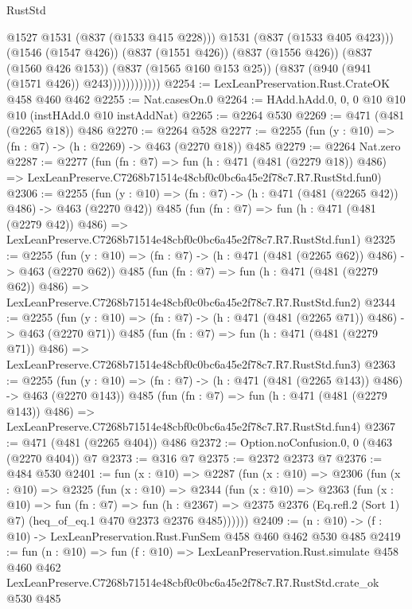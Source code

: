 \begin{lexlean}{RustStd}
\begin{coremodule}
                            @1527
                            @1531
                            (@837 (@1533 @415 @228)))
                          @1531
                          (@837 (@1533 @405 @423)))
                        (@1546 (@1547 @426))
                        (@837 (@1551 @426))
                        (@837 (@1556 @426))
                        (@837 (@1560 @426 @153))
                        (@837 (@1565 @160 @153 @25))
                        (@837 (@940 (@941 (@1571 @426)) @243))))))))))))
@2254 := LexLeanPreservation.Rust.CrateOK @458 @460 @462
@2255 := Nat.casesOn.{0}
@2264 := HAdd.hAdd.{0, 0, 0} @10 @10 @10 (instHAdd.{0} @10 instAddNat)
@2265 := @2264 @530
@2269 := @471 (@481 (@2265 @18)) @486
@2270 := @2264 @528
@2277 := @2255 (fun (y : @10) => (fn : @7) -> (h : @2269) -> @463 (@2270 @18)) @485
@2279 := @2264 Nat.zero
@2287 := @2277
    (fun (fn : @7) =>
    fun (h : @471 (@481 (@2279 @18)) @486) =>
    LexLeanPreserve.C7268b71514e48cbf0c0bc6a45e2f78c7.R7.RustStd.fun0)
@2306 := @2255
    (fun (y : @10) => (fn : @7) -> (h : @471 (@481 (@2265 @42)) @486) -> @463 (@2270 @42))
    @485
    (fun (fn : @7) =>
    fun (h : @471 (@481 (@2279 @42)) @486) =>
    LexLeanPreserve.C7268b71514e48cbf0c0bc6a45e2f78c7.R7.RustStd.fun1)
@2325 := @2255
    (fun (y : @10) => (fn : @7) -> (h : @471 (@481 (@2265 @62)) @486) -> @463 (@2270 @62))
    @485
    (fun (fn : @7) =>
    fun (h : @471 (@481 (@2279 @62)) @486) =>
    LexLeanPreserve.C7268b71514e48cbf0c0bc6a45e2f78c7.R7.RustStd.fun2)
@2344 := @2255
    (fun (y : @10) => (fn : @7) -> (h : @471 (@481 (@2265 @71)) @486) -> @463 (@2270 @71))
    @485
    (fun (fn : @7) =>
    fun (h : @471 (@481 (@2279 @71)) @486) =>
    LexLeanPreserve.C7268b71514e48cbf0c0bc6a45e2f78c7.R7.RustStd.fun3)
@2363 := @2255
    (fun (y : @10) => (fn : @7) -> (h : @471 (@481 (@2265 @143)) @486) -> @463 (@2270 @143))
    @485
    (fun (fn : @7) =>
    fun (h : @471 (@481 (@2279 @143)) @486) =>
    LexLeanPreserve.C7268b71514e48cbf0c0bc6a45e2f78c7.R7.RustStd.fun4)
@2367 := @471 (@481 (@2265 @404)) @486
@2372 := Option.noConfusion.{0, 0} (@463 (@2270 @404)) @7
@2373 := @316 @7
@2375 := @2372 @2373 @7
@2376 := @484 @530
@2401 := fun (x : @10) =>
  @2287
    (fun (x : @10) =>
    @2306
      (fun (x : @10) =>
      @2325
        (fun (x : @10) =>
        @2344
          (fun (x : @10) =>
          @2363
            (fun (x : @10) =>
            fun (fn : @7) =>
            fun (h : @2367) =>
            @2375 @2376 (Eq.refl.{2} (Sort 1) @7) (heq_of_eq.{1} @470 @2373 @2376 @485))))))
@2409 := (n : @10) -> (f : @10) -> LexLeanPreservation.Rust.FunSem @458 @460 @462 @530 @485
@2419 := fun (n : @10) =>
  fun (f : @10) =>
  LexLeanPreservation.Rust.simulate
    @458
    @460
    @462
    LexLeanPreserve.C7268b71514e48cbf0c0bc6a45e2f78c7.R7.RustStd.crate_ok
    @530
    @485
\end{coremodule}
\end{lexlean}
